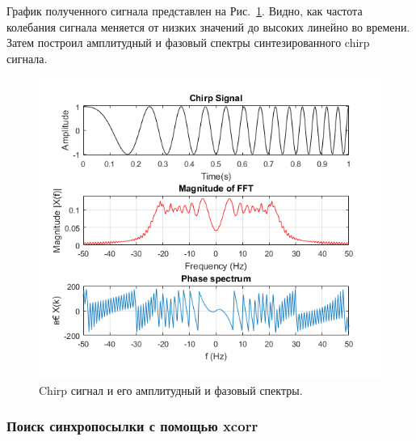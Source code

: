 \documentclass[12pt,a4paper]{article}
\begin{document}
График полученного сигнала представлен на Рис.~\ref{img:sp_chirp}. Видно, как частота колебания сигнала меняется от низких значений до высоких линейно во времени. Затем построил амплитудный и фазовый спектры синтезированного chirp сигнала.
\begin{figure}[H]
\includegraphics[width=\linewidth]{sp_chirp}
\caption{Chirp сигнал и его амплитудный и фазовый спектры.}
\label{img:sp_chirp}
\end{figure}

\subsubsection{Поиск синхропосылки с помощью xcorr}
\end{document}
